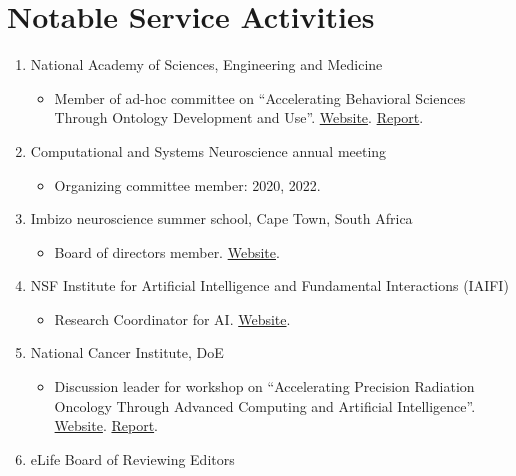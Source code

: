 \section*{Notable Service Activities}

  \begin{enumerate}
      \item National Academy of Sciences, Engineering and Medicine
          \begin{itemize}
             \item Member of ad-hoc committee on ``Accelerating Behavioral Sciences Through Ontology Development and Use''. \href{https://www.nationalacademies.org/our-work/accelerating-social-and-behavioral-science-through-ontology-development-and-use}{Website}. \href{https://nap.nationalacademies.org/catalog/26464/ontologies-in-the-behavioral-sciences-accelerating-research-and-the-spread?utm_source=All+DBASSE+Newsletters&utm_campaign=36883ad3ec-new-report-ontologies}{Report}.
          \end{itemize}

	  \item Computational and Systems Neuroscience annual meeting
	  	\begin{itemize}
	  		\item Organizing committee member: 2020, 2022.
	  	\end{itemize}
	  	
	  \item Imbizo neuroscience summer school, Cape Town, South Africa
	  	\begin{itemize}
	  		\item Board of directors member. \href{https://imbizo.africa/}{Website}.
	  	\end{itemize}	  
	  	
	  \item NSF Institute for Artificial Intelligence and Fundamental Interactions (IAIFI)
	  	\begin{itemize}
	  		\item Research Coordinator for AI. \href{https://iaifi.org/}{Website}.
	  	\end{itemize}	

      \item National Cancer Institute, DoE
          \begin{itemize}
             \item Discussion leader for workshop on ``Accelerating Precision Radiation Oncology Through Advanced Computing and Artificial Intelligence''. \href{https://events.cancer.gov/cbiit/radonc2021}{Website}. \href{https://meridian.allenpress.com/radiation-research/article/197/4/434/477175/Predictive-Radiation-Oncology-A-New-NCI-DOE}{Report}.
          \end{itemize}
          
       \item eLife Board of Reviewing Editors
         
	  		  	
  \end{enumerate}
  
  



